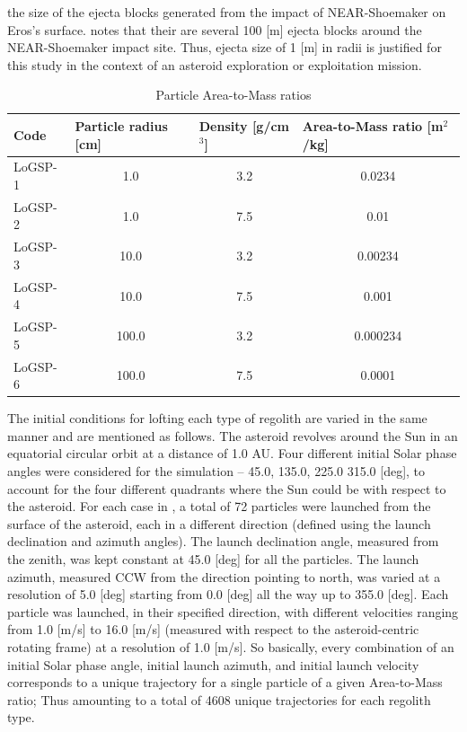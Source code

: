 the size of the ejecta blocks generated from the impact of \gls{NEAR}-Shoemaker on Eros's surface. \cite{Robinson2001} notes that their are several 100 [m] ejecta blocks around the \gls{NEAR}-Shoemaker impact site. Thus, ejecta size of 1 [m] in radii is justified for this study in the context of an asteroid exploration or exploitation mission.
\begin{table}[htb]
\centering
\captionsetup{justification=centering}
\caption{Particle Area-to-Mass ratios}
\label{tab:area_to_mass_ratio}
\begin{tabular}{|l|c|c|c|}
\hline
Code    & \multicolumn{1}{l|}{Particle radius {[}cm{]}} & \multicolumn{1}{l|}{Density {[}g/cm$^3${]}} & \multicolumn{1}{l|}{Area-to-Mass ratio {[}m$^2$/kg{]}} \\ \hline
LoGSP-1     &   1.0     &   3.2     & 0.0234        \\ \hline
LoGSP-2     &   1.0     &   7.5     & 0.01          \\ \hline
LoGSP-3     &   10.0    &   3.2     & 0.00234       \\ \hline
LoGSP-4     &   10.0    &   7.5     & 0.001         \\ \hline
LoGSP-5     &   100.0   &   3.2     & 0.000234      \\ \hline
LoGSP-6     &   100.0   &   7.5     & 0.0001        \\ \hline
\end{tabular}
\end{table}
\FloatBarrier
The initial conditions for lofting each type of regolith are varied in the same manner and are mentioned as follows. The asteroid revolves around the Sun in an equatorial circular orbit at a distance of 1.0 \gls{AU}. Four different initial Solar phase angles were considered for the simulation – 45.0, 135.0, 225.0 315.0 [deg], to account for the four different quadrants where the Sun could be with respect to the asteroid. For each case in , a total of 72 particles were launched from the surface of the asteroid, each in a different direction (defined using the launch declination and azimuth angles). The launch declination angle, measured from the zenith, was kept constant at 45.0 [deg] for all the particles. The launch azimuth, measured \gls{CCW} from the direction pointing to north, was varied at a resolution of 5.0 [deg] starting from 0.0 [deg] all the way up to 355.0 [deg]. Each particle was launched, in their specified direction, with different velocities ranging from 1.0 [m/s] to 16.0 [m/s] (measured with respect to the asteroid-centric rotating frame) at a resolution of 1.0 [m/s]. So basically, every combination of an initial Solar phase angle, initial launch azimuth, and initial launch velocity corresponds to a unique trajectory for a single particle of a given Area-to-Mass ratio; Thus amounting to a total of 4608 unique trajectories for each regolith type.

